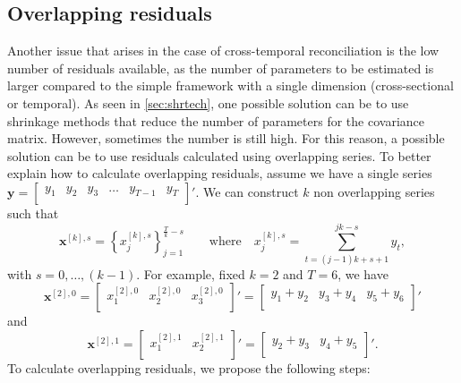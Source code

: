 \documentclass[a4paper,11pt]{article}
\newcommand{\xvet}{\bm{x}}
\newcommand{\yvet}{\bm{y}}
\theoremstyle{definition}
\begin{document}
\subsection{Overlapping residuals}\label{ssec:over_res}

Another issue that arises in the case of cross-temporal reconciliation is the low number of residuals available, as the number of parameters to be estimated is larger compared to the simple framework with a single dimension (cross-sectional or temporal). As seen in \autoref{sec:shrtech}, one possible solution can be to use shrinkage methods that reduce the number of parameters for the covariance matrix. However, sometimes the number is still high. For this reason, a possible solution can be to use residuals calculated using overlapping series. To better explain how to calculate overlapping residuals, assume we have a single series
$
	\yvet = \begin{bmatrix}
		y_1 & y_2 & y_3 & \dots & y_{T-1} & y_{T} \\
	\end{bmatrix}'.
$
We can construct $k$ non overlapping series such that
$$
	\xvet^{[k], s} = \left\{x^{[k],s}_{j}\right\}_{j = 1}^{\frac{T}{k}-s} \qquad \mathrm{where} \quad x^{[k],s}_{j} = \sum_{t = (j-1)k+s+1}^{jk-s} y_t,
$$
with $s = 0, \dots, (k-1)$.
For example, fixed $k = 2$ and $T = 6$, we have
$$
	\xvet^{[2], 0} = \begin{bmatrix}
		x_1^{[2], 0} & x_2^{[2], 0} & x_{3}^{[2], 0} \\
	\end{bmatrix}' =\begin{bmatrix}
		y_1 + y_2 & y_3 + y_4 & y_5 + y_6 \\
	\end{bmatrix}'
$$
and
$$
	\xvet^{[2], 1} = \begin{bmatrix}
		x_1^{[2], 1} & x_2^{[2], 1} \\
	\end{bmatrix}' =\begin{bmatrix}
		y_2 + y_3 & y_4 + y_5 \\
	\end{bmatrix}'.
$$
To calculate overlapping residuals, we propose the following steps:
\end{document}

